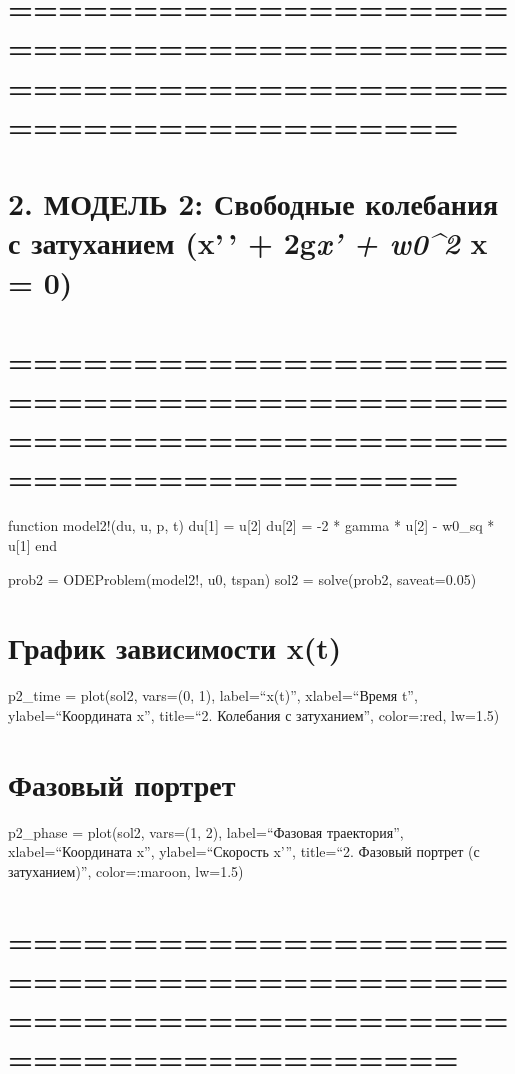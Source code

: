 \documentclass[
  english,
  russian,
  12pt,
  a4paper,
  DIV=11,
  numbers=noendperiod]{scrreprt}
\begin{document}
\chapter{==============================================================================}\label{section-2}

\chapter{\texorpdfstring{2. МОДЕЛЬ 2: Свободные колебания с затуханием
(x'\,' + 2g\emph{x' + w0\^{}2 } x =
0)}{2. МОДЕЛЬ 2: Свободные колебания с затуханием (x'\,' + 2gx' + w0\^{}2  x = 0)}}\label{ux43cux43eux434ux435ux43bux44c-2-ux441ux432ux43eux431ux43eux434ux43dux44bux435-ux43aux43eux43bux435ux431ux430ux43dux438ux44f-ux441-ux437ux430ux442ux443ux445ux430ux43dux438ux435ux43c-x-2gx-w02-x-0}

\chapter{==============================================================================}\label{section-3}

function model2!(du, u, p, t) du{[}1{]} = u{[}2{]} du{[}2{]} = -2 *
gamma * u{[}2{]} - w0\_sq * u{[}1{]} end

prob2 = ODEProblem(model2!, u0, tspan) sol2 = solve(prob2, saveat=0.05)

\chapter{График зависимости
x(t)}\label{ux433ux440ux430ux444ux438ux43a-ux437ux430ux432ux438ux441ux438ux43cux43eux441ux442ux438-xt-1}

p2\_time = plot(sol2, vars=(0, 1), label=\enquote{x(t)},
xlabel=\enquote{Время t}, ylabel=\enquote{Координата x},
title=\enquote{2. Колебания с затуханием}, color=:red, lw=1.5)

\chapter{Фазовый
портрет}\label{ux444ux430ux437ux43eux432ux44bux439-ux43fux43eux440ux442ux440ux435ux442}

p2\_phase = plot(sol2, vars=(1, 2), label=\enquote{Фазовая траектория},
xlabel=\enquote{Координата x}, ylabel=\enquote{Скорость x'},
title=\enquote{2. Фазовый портрет (с затуханием)}, color=:maroon,
lw=1.5)

\chapter{==============================================================================}\label{section-4}
\end{document}
